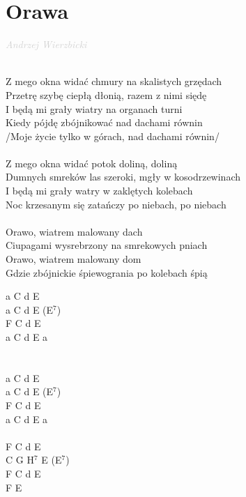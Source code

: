 \documentclass[a5paper, 10pt]{book}
\begin{document}
\section{Orawa}\textcolor{lightgray}{\textit{Andrzej Wierzbicki}}\\~\\
\begin{minipage}[t]{0.8\textwidth}
Z mego okna widać chmury na skalistych grzędach\\
Przetrę szybę ciepłą dłonią, razem z nimi siędę	\\
I będą mi grały wiatry na organach turni\\
Kiedy pójdę zbójnikować nad dachami równin		\\
/Moje życie tylko w górach, nad dachami równin/\\
\\
Z mego okna widać potok doliną, doliną\\
Dumnych smreków las szeroki, mgły w kosodrzewinach\\
I będą mi grały watry w zaklętych kolebach\\
Noc krzesanym się zatańczy po niebach, po niebach\\
\\
\hspace*{5mm}Orawo, wiatrem malowany dach				\\
\hspace*{5mm}Ciupagami wysrebrzony na smrekowych pniach\\
\hspace*{5mm}Orawo, wiatrem malowany dom				\\
\hspace*{5mm}Gdzie zbójnickie śpiewogrania po kolebach śpią\\

\end{minipage}
\begin{minipage}[t]{0.2\textwidth}
a C d  E\\
a C d E (E$^7$)\\
F C d  E\\
a C d E a\\
\\
\\
a C d  E\\
a C d E (E$^7$)\\
F C d  E\\
a C d E a\\
\\
 F C d E\\
C G H$^7$ E (E$^7$)\\
F C d  E\\
F E \\
 \end{minipage}
\end{document}
